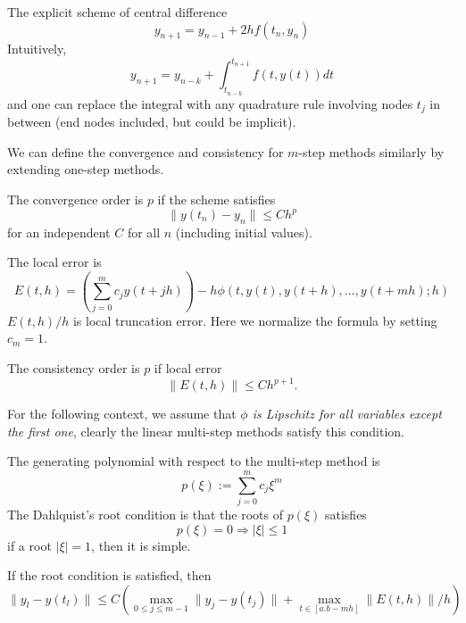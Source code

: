  \begin{example}
     The explicit scheme of central difference
     $$y_{n+1} = y_{n-1} + 2h f(t_n, y_n)$$
     Intuitively, 
     \begin{equation}
         y_{n+1} = y_{n-k} + \int_{t_{n-k}}^{t_{n+1}} f(t, y(t)) dt
     \end{equation}
     and one can replace the integral with any quadrature rule involving nodes $t_{j}$ in between (end nodes included, but could be implicit).
 \end{example}
We can define the convergence and consistency for $m$-step methods similarly by extending one-step methods.
\begin{definition}[convergence]
    The convergence order is $p$ if the scheme satisfies 
    $$\|y(t_n) - y_n\|\le C h^p$$
    for an independent $C$ for all $n$ (including initial values). 
\end{definition}
\begin{definition}
    The local error is
    \begin{equation}
        E(t, h) = \left(\sum_{j=0}^m c_j y(t + jh) \right) - h\phi(t, y(t), y(t+h),\dots, y(t + mh); h)
    \end{equation}
    $E(t, h)/h$ is local truncation error. Here we normalize the formula by setting $c_m = 1$.
\end{definition}
\begin{definition}[consistency]
    The consistency order is $p$ if local error 
    $$\|E(t, h)\|\le C h^{p+1}.$$
\end{definition}
For the following context, we assume that \emph{$\phi$ is Lipschitz for all variables except the first one}, clearly the linear multi-step methods satisfy this condition. 
\begin{definition}
    The generating polynomial with respect to the multi-step method is 
    \begin{equation}
        p(\xi) := \sum_{j=0}^m c_j \xi^m
    \end{equation}
    The Dahlquist's root condition is that the roots of $p(\xi)$ satisfies 
    \begin{equation}
        p(\xi) = 0\Rightarrow |\xi|\le 1
    \end{equation}
    if a root $|\xi| = 1$, then it is simple. 
\end{definition}
\begin{theorem}
    If the root condition is satisfied, then 
    \begin{equation}
        \|y_l - y(t_l)\|\le C \left(\max_{0\le j\le m-1} \|y_j - y(t_j)\| + \max_{t\in[a. b - mh]} \|E(t, h)\|/h\right)
    \end{equation}
\end{theorem}
